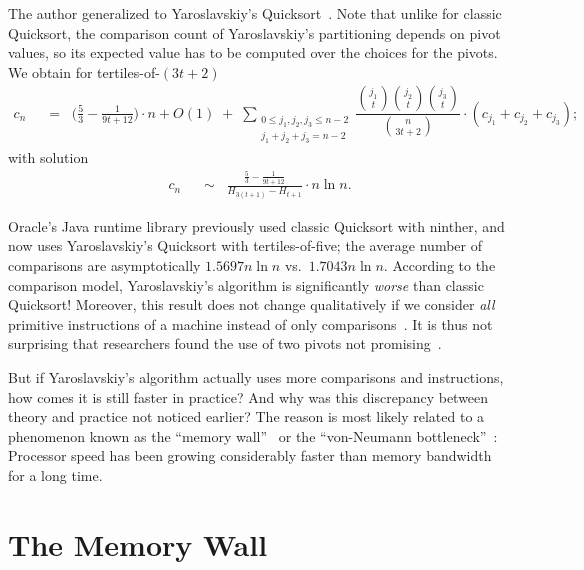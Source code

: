 \documentclass[]{theotage}
\newcommand\wwrel[1]{\mathrel{\;\;{#1}\;\;}}
\newcommand\wbin[1]{\mathbin{\;{#1}\;}}
\begin{document}
The author generalized  to Yaroslavskiy's Quicksort~\cite{Wild2012,Wild2012thesis,MartinezNebelWild2015aofaFullPaper}.
Note that unlike for classic Quicksort, 
the comparison count of Yaroslavskiy's partitioning depends on pivot values,
so its expected value has to be computed over the choices for the pivots.
We obtain for tertiles-of-$(3t+2)$
\begin{align}
\label{eq:recurrence-cmps-yaros}
		c_n
	&\wwrel=
		\biggl(\frac53-\frac1{9t+12}\biggr)\cdot n + O(1) \wbin+ 
		\sum_{\substack{0\le j_1,j_2,j_3 \le n-2\\j_1+j_2+j_3=n-2}}
		\dfrac{ \binom{j_1}{t}\binom{j_2}{t}\binom{j_3}{t} }{ \binom n{3t+2} } \cdot
		(c_{j_1} + c_{j_2} + c_{j_3});
\end{align}
with solution
\begin{align*}
		c_n 
	&\wwrel\sim
		\frac{\frac53-\frac1{9t+12}}{H_{3(t+1)} - H_{t+1}} \cdot n\ln n.
\end{align*}

Oracle's Java runtime library previously used classic Quicksort with ninther, and now uses 
Yaroslavskiy's Quicksort with tertiles-of-five;
the average number of comparisons are asymptotically $1.5697 n\ln n$ vs.\ $1.7043 n\ln n$.
According to the comparison model, Yaroslavskiy's algorithm is significantly \emph{worse} 
than classic Quicksort!
Moreover, this result does not change qualitatively if we consider \emph{all}
primitive instructions of a machine instead of only comparisons~\cite{Wild2012,MartinezNebelWild2015aofaFullPaper}.
It is thus not surprising that researchers found the use of 
two pivots not promising~\cite{Sedgewick1975,Hennequin1991}.

But if Yaroslavskiy's algorithm actually uses more comparisons and instructions,
how comes it is still faster in practice?
And why was this discrepancy between theory and practice not noticed earlier?
The reason is most likely related to a phenomenon known as the 
``memory wall''~\cite{Wulf1995,McKee2004} or the ``von-Neumann bottleneck''~\cite{Backus1978}:
Processor speed has been growing considerably faster than memory bandwidth for a long time.


\section{The Memory Wall}
\label{sec:memory-wall}
\end{document}
